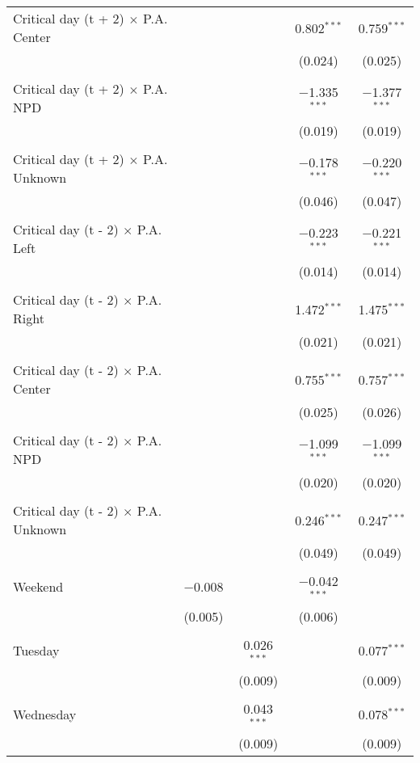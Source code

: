 \documentclass[
]{article}
\begin{document}
\begin{table}[!htbp]
{\begin{tabular}{@{\extracolsep{5pt}}lcccc}
 Critical day (t + 2) $\times$ P.A. Center &  &  & 0.802$^{***}$ & 0.759$^{***}$ \\ 
  &  &  & (0.024) & (0.025) \\ 
  & & & & \\ 
 Critical day (t + 2) $\times$ P.A. NPD &  &  & $-$1.335$^{***}$ & $-$1.377$^{***}$ \\ 
  &  &  & (0.019) & (0.019) \\ 
  & & & & \\ 
 Critical day (t + 2) $\times$ P.A. Unknown &  &  & $-$0.178$^{***}$ & $-$0.220$^{***}$ \\ 
  &  &  & (0.046) & (0.047) \\ 
  & & & & \\ 
 Critical day (t - 2) $\times$ P.A. Left &  &  & $-$0.223$^{***}$ & $-$0.221$^{***}$ \\ 
  &  &  & (0.014) & (0.014) \\ 
  & & & & \\ 
 Critical day (t - 2) $\times$ P.A. Right &  &  & 1.472$^{***}$ & 1.475$^{***}$ \\ 
  &  &  & (0.021) & (0.021) \\ 
  & & & & \\ 
 Critical day (t - 2) $\times$ P.A. Center &  &  & 0.755$^{***}$ & 0.757$^{***}$ \\ 
  &  &  & (0.025) & (0.026) \\ 
  & & & & \\ 
 Critical day (t - 2) $\times$ P.A. NPD &  &  & $-$1.099$^{***}$ & $-$1.099$^{***}$ \\ 
  &  &  & (0.020) & (0.020) \\ 
  & & & & \\ 
 Critical day (t - 2) $\times$ P.A. Unknown &  &  & 0.246$^{***}$ & 0.247$^{***}$ \\ 
  &  &  & (0.049) & (0.049) \\ 
  & & & & \\ 
 Weekend & $-$0.008 &  & $-$0.042$^{***}$ &  \\ 
  & (0.005) &  & (0.006) &  \\ 
  & & & & \\ 
 Tuesday &  & 0.026$^{***}$ &  & 0.077$^{***}$ \\ 
  &  & (0.009) &  & (0.009) \\ 
  & & & & \\ 
 Wednesday &  & 0.043$^{***}$ &  & 0.078$^{***}$ \\ 
  &  & (0.009) &  & (0.009) \\ 

\end{tabular}}
\end{table}
\end{document}
